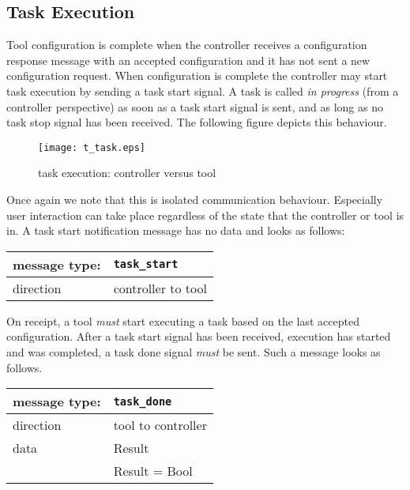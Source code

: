 \documentclass{article}
\newcommand{\msg}[1]{\texttt{#1}}
\begin{document}
  \subsection{Task Execution} \label{ss::task_execution}

   \noindent Tool configuration is complete when the controller receives a
   configuration response message with an accepted configuration and it has not
   sent a new configuration request.  When configuration is complete the
   controller may start task execution by sending a task start signal. A task
   is called \textit{in progress} (from a controller perspective) as soon as a
   task start signal is sent, and as long as no task stop signal has been
   received. The following figure depicts this behaviour.

   \begin{figure}[H]
    \begin{center}
     \texttt{[image: t\_task.eps]}
    \end{center}
    \vspace{-0.3cm}
    \caption{task execution: controller versus tool}
   \end{figure}

   \noindent Once again we note that this is isolated communication behaviour.
   Especially user interaction can take place regardless of the state that the
   controller or tool is in. A task start notification message has no data and
   looks as follows:

   \begin{table}[H]
    \begin{center}
     \begin{tabular}{|ll|}
      \hline
       message type:   & \msg{task\_start} \\
      \hline
       direction       & controller to tool \\
      \hline
     \end{tabular}
    \end{center}
    \vspace{-0.3cm}
   \end{table}

   \noindent On receipt, a tool \emph{must} start executing a task based on the
   last accepted configuration. After a task start signal has been received,
   execution has started and was completed, a task done signal \emph{must} be
   sent. Such a message looks as follows.

   \begin{table}[H]
    \begin{center}
     \begin{tabular}{|ll|}
      \hline
       message type:   & \msg{task\_done} \\
      \hline
       direction       & tool to controller \\
       data            & Result \\
                       & Result = Bool \\
      \hline
     \end{tabular}
    \end{center}
    \vspace{-0.3cm}
   \end{table}
\end{document}
